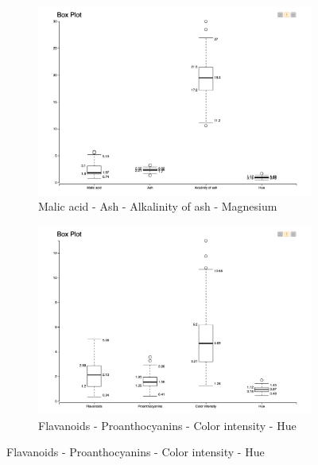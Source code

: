 \documentclass[11pt]{article}
\begin{document}
				\begin{figure}[H]
					\centering
					\begin{subfigure}{0.4\textwidth}
						\includegraphics[width=\textwidth]{res/t0/t03/t03-results-box-plot-1}
						\caption{Malic acid - Ash - Alkalinity of ash - Magnesium}
						\label{fig:first}
					\end{subfigure}
					\hfill
					\begin{subfigure}{0.4\textwidth}
						\includegraphics[width=\textwidth]{res/t0/t03/t03-results-box-plot-2}
						\caption{Flavanoids - Proanthocyanins - Color intensity - Hue}
						\label{fig:second}
					\end{subfigure}
					\hfill
				\end{figure}
				\fi
\end{document}

